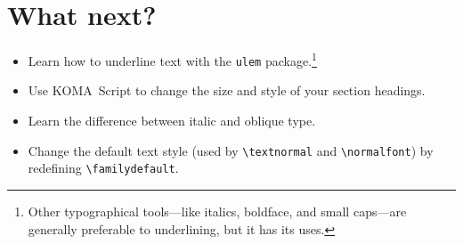\section{What next?}
\begin{itemize}
\item Learn how to underline text with the \texttt{ulem}
    package.\punckern\footnote{Other typographical tools---like italics,
    boldface, and small caps---are generally preferable to underlining,
    but it has its uses.}
\item Use KOMA~Script to change the size and style of your section headings.
\item Learn the difference between italic and oblique type.
\item Change the default text style
    (used by \verb|\textnormal| and \verb|\normalfont|) by redefining
    \verb|\familydefault|.
\end{itemize}
